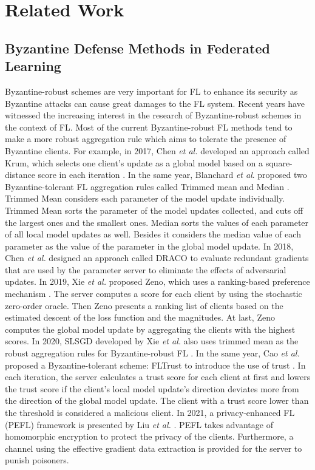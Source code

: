 \documentclass[journal]{IEEEtran}
\begin{document}
\section{Related Work}

\subsection{Byzantine Defense Methods in Federated Learning}
Byzantine-robust schemes are very important for FL to enhance its security as Byzantine attacks can cause great damages to the FL system. Recent years have witnessed the increasing interest in the research of Byzantine-robust schemes in the context of FL. Most of the current Byzantine-robust FL methods tend to make a more robust aggregation rule which aims to tolerate the presence of Byzantine clients. 
For example, in 2017, Chen \textit{et al.} developed an approach called Krum, which selects one client's update as a global model based on a square-distance score in each iteration \cite{ref_12_defense}.
In the same year, Blanchard \textit{et al}. proposed two Byzantine-tolerant FL aggregation rules called Trimmed mean and Median \cite{ref_16_defense}. Trimmed Mean considers each parameter of the model update individually. Trimmed Mean sorts the parameter of the model updates collected, and cuts off the largest ones and the smallest ones. Median sorts the values of each parameter of all local model updates as well. Besides it considers the median value of each parameter as the value of the parameter in the global model update. 
In 2018, Chen \textit{et al.} designed an approach called DRACO to evaluate redundant gradients that are used by the parameter server to eliminate the effects of adversarial updates. 
In 2019, Xie \textit{et al.} proposed Zeno, which uses a ranking-based preference mechanism \cite{ref_15_defense}. The server computes a score for each client by using the stochastic zero-order oracle. Then Zeno presents a ranking list of clients based on the estimated descent of the loss function and the magnitudes. At last, Zeno computes the global model update by aggregating the clients with the highest scores. 
In 2020, SLSGD developed by Xie \textit{et al.} also uses trimmed mean as the robust aggregation rules for Byzantine-robust FL \cite{ref_14_defense}. 
In the same year, Cao \textit{et al.} proposed a Byzantine-tolerant scheme: FLTrust to introduce the use of trust \cite{ref_17_defense}. In each iteration, the server calculates a trust score for each client at first and lowers the trust score if the client's local model update's direction deviates more from the direction of the global model update. The client with a trust score lower than the threshold is considered a malicious client.
In 2021, a privacy-enhanced FL (PEFL) framework is presented by Liu \textit{et al.}  \cite{ref_45_defense}. PEFL takes advantage of homomorphic encryption to protect the privacy of the clients. Furthermore, a channel using the effective gradient data extraction is provided for the server to punish poisoners.
\end{document}
